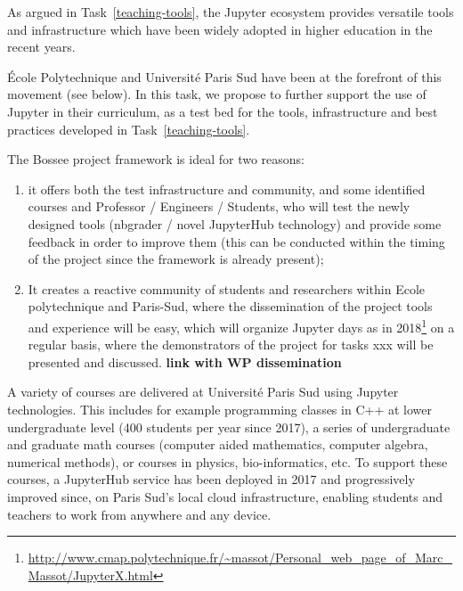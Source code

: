 \begin{task}[
  title=Teaching with Jupyter technology,
  id=teaching,
  lead=EP,
  PM=4, %
  wphases={0-48},
  partners={UPSUD,XFEL}
  ]

  As argued in Task~\ref{teaching-tools}, the Jupyter ecosystem
  provides versatile tools and infrastructure which have been widely
  adopted in higher education in the recent years.

  École Polytechnique
  and Université Paris Sud have been at the forefront of this movement
  (see below). In this task, we propose to further support the use of
  Jupyter in their curriculum, as a test bed for the tools,
  infrastructure and best practices developed in
  Task~\ref{teaching-tools}.


  The Bossee project framework is ideal for two reasons:
  \begin{enumerate}
    \item it offers both the test infrastructure and community, and some identified courses and
  Professor / Engineers / Students, who will test the newly designed tools
  (nbgrader / novel JupyterHub technology) and provide some feedback in order to
  improve them (this can be conducted within the timing of the project since the
  framework is already present);
    \item It creates a reactive community of students
  and researchers within Ecole polytechnique and Paris-Sud, where the
  dissemination of the project tools and experience will be easy, which will
  organize Jupyter days as in 2018\footnote{\url{http://www.cmap.polytechnique.fr/~massot/Personal_web_page_of_Marc_Massot/JupyterX.html}} on a regular basis, where the demonstrators of the
  project for tasks xxx will be presented and discussed. {\bf link with WP
    dissemination}
  \end{enumerate}


  A variety of courses are delivered at Université Paris Sud using
  Jupyter technologies. This includes for example programming classes
  in C++ at lower undergraduate level (400 students per year since
  2017), a series of undergraduate and graduate math courses (computer
  aided mathematics, computer algebra, numerical methods), or courses
  in physics, bio-informatics, etc. To support these courses, a
  JupyterHub service has been deployed in 2017 and progressively
  improved since, on Paris Sud's local cloud infrastructure, enabling
  students and teachers to work from anywhere and any device.


\end{task}
